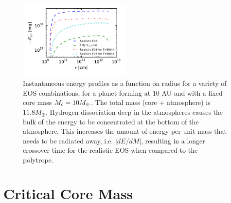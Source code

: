 \documentclass[apj]{emulateapj}
\begin{document}
\begin{figure}[h]
\centering
\includegraphics[width=0.5\textwidth]{../../figs/ModelAtmospheres/RadSelfGravRealEOS/EOSeffects/Er_plot.pdf}
\caption{Instantaneous energy profiles as a function on radius for a variety of EOS combinations, for a planet forming at 10 AU and with a fixed core mass $M_{\rm c}=10 M_{\oplus}$. The total mass (core + atmosphere) is $11.8 M_{\oplus}$. Hydrogen dissociation deep in the atmospheres causes the bulk of the energy to be concentrated at the bottom of the atmosphere. This increases the amount of energy per unit mass that needs to be radiated away, i.e. $|dE/dM|$, resulting in a longer crossover time for the realistic EOS when compared to the polytrope.}
\label{fig:Erplot}
\end{figure}







\section{Critical Core Mass}
\label{critical}

\end{document}
